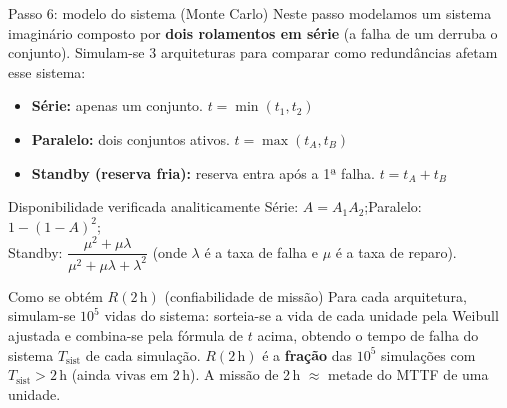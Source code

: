 \documentclass{beamer}
\begin{document}
\begin{frame}{Passo 6: modelo do sistema (Monte Carlo)}
    \scriptsize
    Neste passo modelamos um sistema imaginário composto por \textbf{dois rolamentos em série} (a falha de um derruba o conjunto). Simulam-se 3 arquiteturas para comparar como redundâncias afetam esse sistema:
    \vspace{0.15cm}
    \begin{itemize}
        \item \textbf{Série:} apenas um conjunto. \hfill $t = \min(t_1, t_2)$
        \item \textbf{Paralelo:} dois conjuntos ativos. \hfill $t = \max(t_A, t_B)$
        \item \textbf{Standby (reserva fria):} reserva entra após a 1ª falha. \hfill $t = t_A + t_B$
    \end{itemize}
    \vspace{0.15cm}
    \begin{block}{Disponibilidade verificada analiticamente}
        Série: $A=A_1 A_2$;\quad Paralelo: $1-(1-A)^2$;\\
        Standby: $\dfrac{\mu^2+\mu\lambda}{\mu^2+\mu\lambda+\lambda^2}$ (onde $\lambda$ é a taxa de falha e $\mu$ é a taxa de reparo).
    \end{block}
    \vspace{0.1cm}
    \begin{block}{Como se obtém $R(2\,\text{h})$ (confiabilidade de missão)}
        \scriptsize Para cada arquitetura, simulam-se $10^5$ vidas do sistema: sorteia-se a vida de cada unidade pela Weibull ajustada e combina-se pela fórmula de $t$ acima, obtendo o tempo de falha do sistema $T_{\text{sist}}$ de cada simulação. $R(2\,\text{h})$ é a \textbf{fração} das $10^5$ simulações com $T_{\text{sist}} > 2\,\text{h}$ (ainda vivas em 2\,h). A missão de 2\,h $\approx$ metade do MTTF de uma unidade.
    \end{block}
\end{frame}
\end{document}
